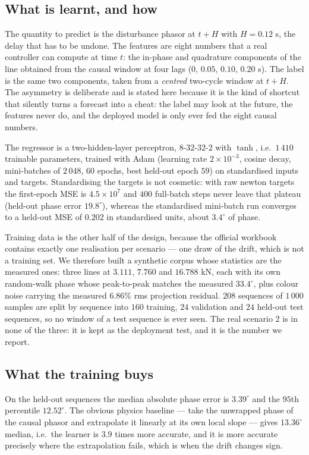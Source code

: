 \documentclass[12pt]{apmcmthesis}
\begin{document}
\subsection{What is learnt, and how}
The quantity to predict is the disturbance phasor at $t+H$ with $H=0.12$ s, the delay that has to
be undone. The features are eight numbers that a real controller can compute at time $t$: the
in-phase and quadrature components of the line obtained from the causal window at four lags
($0$, $0.05$, $0.10$, $0.20$ s). The label is the same two components, taken from a \emph{centred}
two-cycle window at $t+H$. The asymmetry is deliberate and is stated here because it is the kind
of shortcut that silently turns a forecast into a cheat: the label may look at the future, the
features never do, and the deployed model is only ever fed the eight causal numbers.

The regressor is a two-hidden-layer perceptron, $8$-$32$-$32$-$2$ with $\tanh$, i.e.\
$1\,410$ trainable parameters, trained with Adam (learning rate $2\times10^{-3}$, cosine decay,
mini-batches of $2\,048$, $60$ epochs, best held-out epoch $59$) on standardised inputs and
targets. Standardising the targets is not cosmetic: with raw newton targets the first-epoch MSE is
$4.5\times10^{7}$ and $400$ full-batch steps never leave that plateau (held-out phase error
$19.8^\circ$), whereas the standardised mini-batch run converges to a held-out MSE of $0.202$ in
standardised units, about $3.4^\circ$ of phase.

Training data is the other half of the design, because the official workbook contains exactly one
realisation per scenario --- one draw of the drift, which is not a training set. We therefore
built a synthetic corpus whose statistics are the measured ones: three lines at $3.111$, $7.760$
and $16.788$ kN, each with its own random-walk phase whose peak-to-peak matches the measured
$33.4^\circ$, plus colour noise carrying the measured $6.86\%$ rms projection residual.
$208$ sequences of $1\,000$ samples are split by sequence into $160$ training, $24$ validation and
$24$ held-out test sequences, so no window of a test sequence is ever seen. The real scenario 2 is
in none of the three: it is kept as the deployment test, and it is the number we report.

\subsection{What the training buys}
On the held-out sequences the median absolute phase error is $3.39^\circ$ and the $95$th percentile
$12.52^\circ$. The obvious physics baseline --- take the unwrapped phase of the causal phasor and
extrapolate it linearly at its own local slope --- gives $13.36^\circ$ median, i.e.\ the learner is
$3.9$ times more accurate, and it is more accurate precisely where the extrapolation fails, which
is when the drift changes sign.
\end{document}
